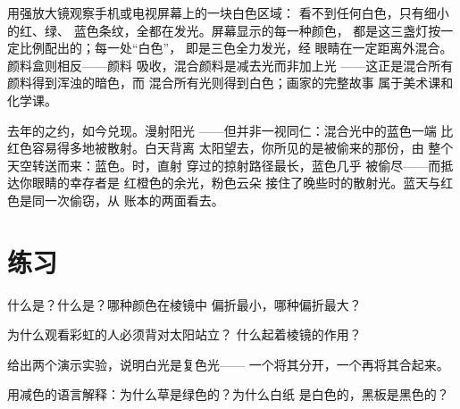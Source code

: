 \begin{example}[口袋里的屏幕]\label{ex:g8:colors-spectra:screen}
用强放大镜观察手机或电视屏幕上的一块白色区域：
看不到任何白色，只有细小的红、绿、
蓝色条纹，全都在发光。屏幕显示的每一种颜色，
都是这三盏灯按一定比例配出的；每一处“白色”，
即是三色全力发光，经
眼睛在一定距离外混合。颜料盒则相反——颜料
吸收，混合颜料是减去光而非加上光
——这正是混合所有颜料得到浑浊的暗色，而
混合所有光则得到白色；画家的完整故事
属于美术课和化学课。
\end{example}

\begin{remark}[日落，全数兑现]\label{rem:g8:colors-spectra:sunset}
去年的之约，如今兑现。漫射阳光
——但并非一视同仁：混合光中的蓝色一端
比红色容易得多地被散射。白天背离
太阳望去，你所见的是被偷来的那份，由
整个天空转送而来：蓝色。时，直射
穿过的掠射路径最长，蓝色几乎
被偷尽——而抵达你眼睛的幸存者是
红橙色的余光，粉色云朵
接住了晚些时的散射光。蓝天与红色是同一次偷窃，从
账本的两面看去。
\end{remark}

\section{练习}

\begin{exercise}[$\star$]\label{exo:g8:colors-spectra:1}
什么是？什么是？哪种颜色在棱镜中
偏折最小，哪种偏折最大？
\end{exercise}

\begin{exercise}[$\star$]\label{exo:g8:colors-spectra:2}
为什么观看彩虹的人必须背对太阳站立？
什么起着棱镜的作用？
\end{exercise}

\begin{exercise}[$\star$]\label{exo:g8:colors-spectra:3}
给出两个演示实验，说明白光是复色光——
一个将其分开，一个再将其合起来。
\end{exercise}

\begin{exercise}[$\star$]\label{exo:g8:colors-spectra:4}
用减色的语言解释：为什么草是绿色的？为什么白纸
是白色的，黑板是黑色的？
\end{exercise}

